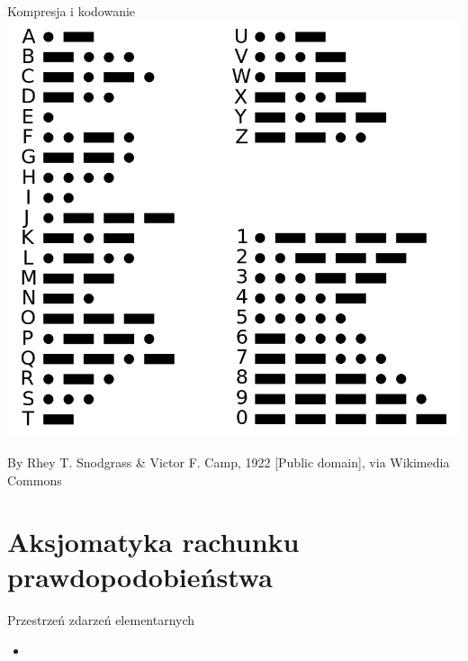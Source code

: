 \documentclass{beamer}
\begin{document}
\begin{frame}{Kompresja i kodowanie}
\centering\includegraphics[width=.7\textwidth]{morse.png}

{\tiny By Rhey T. Snodgrass \& Victor F. Camp, 1922 [Public domain], via Wikimedia Commons}
\end{frame}


\part{Aksjomatyka rachunku prawdopodobieństwa}
\frame{\partpage}
\begin{frame}{Przestrzeń zdarzeń elementarnych}
\begin{itemize}
\item 
\end{itemize}
\end{frame}
\end{document}
